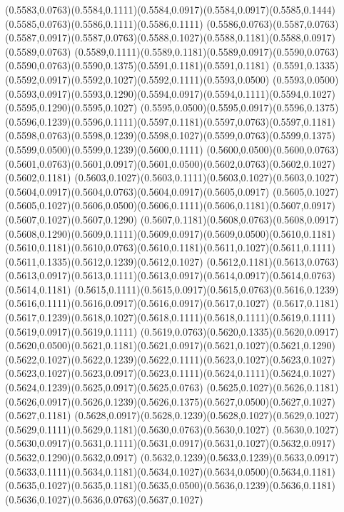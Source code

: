 (0.5583,0.0763)(0.5584,0.1111)(0.5584,0.0917)(0.5584,0.0917)(0.5585,0.1444)(0.5585,0.0763)(0.5586,0.1111)(0.5586,0.1111)
(0.5586,0.0763)(0.5587,0.0763)(0.5587,0.0917)(0.5587,0.0763)(0.5588,0.1027)(0.5588,0.1181)(0.5588,0.0917)(0.5589,0.0763)
(0.5589,0.1111)(0.5589,0.1181)(0.5589,0.0917)(0.5590,0.0763)(0.5590,0.0763)(0.5590,0.1375)(0.5591,0.1181)(0.5591,0.1181)
(0.5591,0.1335)(0.5592,0.0917)(0.5592,0.1027)(0.5592,0.1111)(0.5593,0.0500)
\PST@Solid(0.5593,0.0500)(0.5593,0.0917)(0.5593,0.1290)(0.5594,0.0917)(0.5594,0.1111)(0.5594,0.1027)(0.5595,0.1290)(0.5595,0.1027)
(0.5595,0.0500)(0.5595,0.0917)(0.5596,0.1375)(0.5596,0.1239)(0.5596,0.1111)(0.5597,0.1181)(0.5597,0.0763)(0.5597,0.1181)
(0.5598,0.0763)(0.5598,0.1239)(0.5598,0.1027)(0.5599,0.0763)(0.5599,0.1375)(0.5599,0.0500)(0.5599,0.1239)(0.5600,0.1111)
(0.5600,0.0500)(0.5600,0.0763)(0.5601,0.0763)(0.5601,0.0917)(0.5601,0.0500)(0.5602,0.0763)(0.5602,0.1027)(0.5602,0.1181)
(0.5603,0.1027)(0.5603,0.1111)(0.5603,0.1027)(0.5603,0.1027)(0.5604,0.0917)(0.5604,0.0763)(0.5604,0.0917)(0.5605,0.0917)
(0.5605,0.1027)(0.5605,0.1027)(0.5606,0.0500)(0.5606,0.1111)(0.5606,0.1181)(0.5607,0.0917)(0.5607,0.1027)(0.5607,0.1290)
(0.5607,0.1181)(0.5608,0.0763)(0.5608,0.0917)(0.5608,0.1290)(0.5609,0.1111)(0.5609,0.0917)(0.5609,0.0500)(0.5610,0.1181)
(0.5610,0.1181)(0.5610,0.0763)(0.5610,0.1181)(0.5611,0.1027)(0.5611,0.1111)(0.5611,0.1335)(0.5612,0.1239)(0.5612,0.1027)
(0.5612,0.1181)(0.5613,0.0763)(0.5613,0.0917)(0.5613,0.1111)(0.5613,0.0917)(0.5614,0.0917)(0.5614,0.0763)(0.5614,0.1181)
(0.5615,0.1111)(0.5615,0.0917)(0.5615,0.0763)(0.5616,0.1239)(0.5616,0.1111)(0.5616,0.0917)(0.5616,0.0917)(0.5617,0.1027)
(0.5617,0.1181)(0.5617,0.1239)(0.5618,0.1027)(0.5618,0.1111)(0.5618,0.1111)(0.5619,0.1111)(0.5619,0.0917)(0.5619,0.1111)
(0.5619,0.0763)(0.5620,0.1335)(0.5620,0.0917)(0.5620,0.0500)(0.5621,0.1181)(0.5621,0.0917)(0.5621,0.1027)(0.5621,0.1290)
(0.5622,0.1027)(0.5622,0.1239)(0.5622,0.1111)(0.5623,0.1027)(0.5623,0.1027)
\PST@Solid(0.5623,0.1027)(0.5623,0.0917)(0.5623,0.1111)(0.5624,0.1111)(0.5624,0.1027)(0.5624,0.1239)(0.5625,0.0917)(0.5625,0.0763)
(0.5625,0.1027)(0.5626,0.1181)(0.5626,0.0917)(0.5626,0.1239)(0.5626,0.1375)(0.5627,0.0500)(0.5627,0.1027)(0.5627,0.1181)
(0.5628,0.0917)(0.5628,0.1239)(0.5628,0.1027)(0.5629,0.1027)(0.5629,0.1111)(0.5629,0.1181)(0.5630,0.0763)(0.5630,0.1027)
(0.5630,0.1027)(0.5630,0.0917)(0.5631,0.1111)(0.5631,0.0917)(0.5631,0.1027)(0.5632,0.0917)(0.5632,0.1290)(0.5632,0.0917)
(0.5632,0.1239)(0.5633,0.1239)(0.5633,0.0917)(0.5633,0.1111)(0.5634,0.1181)(0.5634,0.1027)(0.5634,0.0500)(0.5634,0.1181)
(0.5635,0.1027)(0.5635,0.1181)(0.5635,0.0500)(0.5636,0.1239)(0.5636,0.1181)(0.5636,0.1027)(0.5636,0.0763)(0.5637,0.1027)
